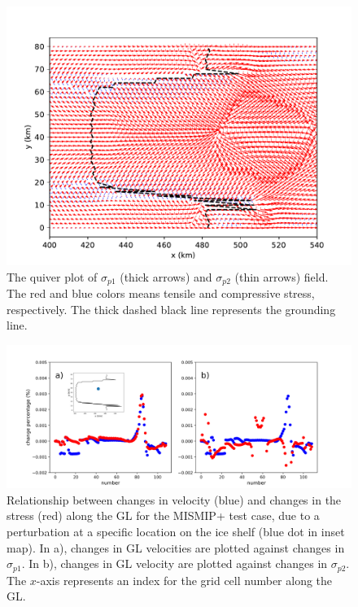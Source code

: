\documentclass[review,oneside]{igs}
\begin{document}
\begin{appendices}
\begin{figure}
	\centering
	\includegraphics[width=1\linewidth]{figs/principal_stress_quiver.pdf}
	\caption{The quiver plot of $\sigma_{p1}$ (thick arrows) and $\sigma_{p2}$ (thin arrows) field. The red and blue colors means tensile and compressive stress, respectively. The thick dashed black line represents the grounding line.}
	\label{principal_stress_quiver}
\end{figure}

\begin{figure}
 	\centering
     \includegraphics[width=1\linewidth]{figs/vel_stress_change_example.pdf}
     \caption{Relationship between changes in velocity (blue) and changes in the stress (red) along the GL for the MISMIP+ test case, due to a perturbation at a specific location on the ice shelf (blue dot in inset map). In a), changes in GL velocities are plotted against changes in $\sigma_{p1}$. In b), changes in GL velocity are plotted against changes in $\sigma_{p2}$. The $x$-axis represents an index for the grid cell number along the GL.}
 	\label{vel_stress_change_example}
\end{figure}


\end{appendices}
\end{document}
